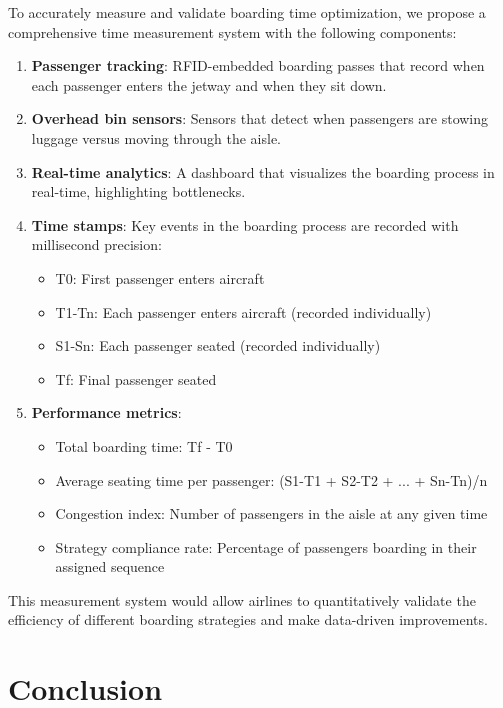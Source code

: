 \documentclass[12pt]{article}
\begin{document}
To accurately measure and validate boarding time optimization, we propose a comprehensive time measurement system with the following components:

\begin{enumerate}
    \item \textbf{Passenger tracking}: RFID-embedded boarding passes that record when each passenger enters the jetway and when they sit down.
    
    \item \textbf{Overhead bin sensors}: Sensors that detect when passengers are stowing luggage versus moving through the aisle.
    
    \item \textbf{Real-time analytics}: A dashboard that visualizes the boarding process in real-time, highlighting bottlenecks.
    
    \item \textbf{Time stamps}: Key events in the boarding process are recorded with millisecond precision:
    \begin{itemize}
        \item T0: First passenger enters aircraft
        \item T1-Tn: Each passenger enters aircraft (recorded individually)
        \item S1-Sn: Each passenger seated (recorded individually)
        \item Tf: Final passenger seated
    \end{itemize}
    
    \item \textbf{Performance metrics}: 
    \begin{itemize}
        \item Total boarding time: Tf - T0
        \item Average seating time per passenger: (S1-T1 + S2-T2 + ... + Sn-Tn)/n
        \item Congestion index: Number of passengers in the aisle at any given time
        \item Strategy compliance rate: Percentage of passengers boarding in their assigned sequence
    \end{itemize}
\end{enumerate}

This measurement system would allow airlines to quantitatively validate the efficiency of different boarding strategies and make data-driven improvements.

\section{Conclusion}
\end{document}
